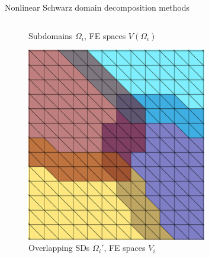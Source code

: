 \begin{frame}[noframenumbering]{Nonlinear Schwarz domain decomposition methods}
\begin{columns}
\begin{column}{0.3\textwidth}
\begin{figure}
				\vspace{-2mm}
				\caption{\tiny Subdomains $\Omega_i$, FE spaces $V(\Omega_i)$}
			\end{figure}
			\vspace{-6mm}
			\begin{figure}
				\includegraphics[height=0.4\textwidth,width=0.7\textwidth]{images/DD-mesh-3.png}
				\vspace{-2mm}
				\caption{\tiny Overlapping SDs $\Omega_i'$, FE spaces $V_i$}
			\end{figure}
		\end{column}

	\end{columns}
\end{frame}


